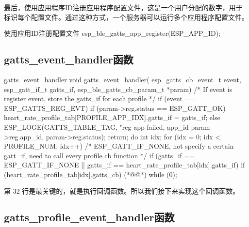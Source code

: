 \documentclass[lang=cn,newtx,10pt,scheme=chinese]{elegantbook}
\begin{document}
最后，使用应用程序ID注册应用程序配置文件，这是一个用户分配的数字，用于标识每个配置文件。通过这种方式，一个服务器可以运行多个应用程序配置文件。

\begin{mycode}{使用应用ID注册配置文件}
esp_ble_gatts_app_register(ESP_APP_ID);
\end{mycode}

\subsection{gatts\_event\_handler函数}

\begin{mycode}{gatts\_event\_handler}
void gatts_event_handler(
    esp_gatts_cb_event_t event,
    esp_gatt_if_t gatts_if,
    esp_ble_gatts_cb_param_t *param)
{
    /* If event is register event, store the gatts_if for each profile */
    if (event == ESP_GATTS_REG_EVT)
    {
        if (param->reg.status == ESP_GATT_OK)
        {
            heart_rate_profile_tab[PROFILE_APP_IDX].gatts_if = gatts_if;
        }
        else
        {
            ESP_LOGE(GATTS_TABLE_TAG, "reg app failed, app_id %
                     param->reg.app_id,
                     param->reg.status);
            return;
        }
    }
    do
    {
        int idx;
        for (idx = 0; idx < PROFILE_NUM; idx++)
        {
            /* ESP_GATT_IF_NONE, not specify a certain gatt_if, need to call every profile cb function */
            if (gatts_if == ESP_GATT_IF_NONE
               || gatts_if == heart_rate_profile_tab[idx].gatts_if)
            {
                if (heart_rate_profile_tab[idx].gatts_cb)
                {
                    (*@@*)
                }
            }
        }
    } while (0);
}
\end{mycode}

第 32 行是最关键的，就是执行回调函数。所以我们接下来实现这个回调函数。

\subsection{gatts\_profile\_event\_handler函数}
\end{document}
